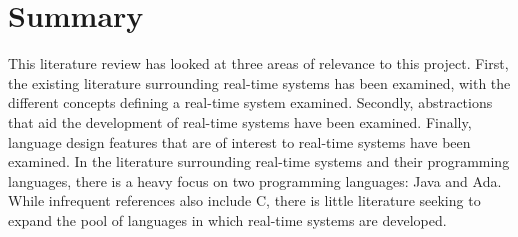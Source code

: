 \section{Summary}
This literature review has looked at three areas of relevance to this project.
First, the existing literature surrounding real-time systems has been examined,
with the different concepts defining a real-time system examined. Secondly,
abstractions that aid the development of real-time systems have been examined.
Finally, language design features that are of interest to real-time systems
have been examined. In the  literature surrounding real-time systems and their
programming languages, there is a heavy focus on two
programming languages: Java and Ada. While infrequent references also include C, 
there is little literature seeking to expand the pool of languages in which 
real-time systems are developed. 
